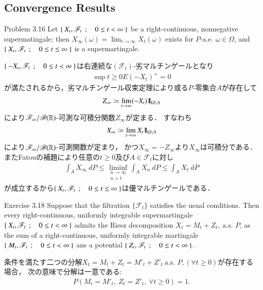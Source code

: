 \subsection{Convergence Results}
	\begin{itembox}[l]{Problem 3.16}
		Let $\left\{\ X_t,\mathscr{F}_t\ \, ; \quad 0 \leq t < \infty\ \right\}$ be a right-continuous, nonnegative
		supermatingale; then $X_\infty(\omega) = \lim_{t \to \infty} X_t(\omega)$ exists for
		$P$-a.e. $\omega \in \Omega$, and $\left\{\ X_t,\mathscr{F}_t\ \, ; \quad 0 \leq t \leq \infty\ \right\}$ is a supermartingale.
	\end{itembox}
	
	\begin{prf}
		$\left\{\ -X_t,\mathscr{F}_t\ \, ; \quad 0 \leq t < \infty\ \right\}$は右連続な$(\mathscr{F}_t)$-劣マルチンゲールとなり
		\begin{align}
			\sup{t \geq 0}{E(-X_t)^+} = 0
		\end{align}
		が満たされるから，劣マルチンゲール収束定理により或る$P$-零集合$A$が存在して
		\begin{align}
			Z_\infty \coloneqq \lim_{t \to \infty} (-X_t)\mbox{1}\hspace{-0.25em}\mbox{l}_{\Omega \backslash A}
		\end{align}
		により$\mathscr{F}_\infty/\mathscr{B}(\mathbb{R})$-可測な可積分関数$Z_\infty$が定まる．
		すなわち
		\begin{align}
			X_\infty \coloneqq \lim_{t \to \infty} X_t\mbox{1}\hspace{-0.25em}\mbox{l}_{\Omega \backslash A}
		\end{align}
		により$\mathscr{F}_\infty/\mathscr{B}(\mathbb{R})$-可測関数が定まり，
		かつ$X_\infty = -Z_\infty$より$X_\infty$は可積分である．
		またFatouの補題により任意の$t \geq 0$及び$A \in \mathscr{F}_t$に対し
		\begin{align}
			\int_A X_\infty\ dP \leq \liminf_{\substack{n \to \infty \\ n > t}} \int_A X_n\ dP \leq \int_A X_t\ dP
		\end{align}
		が成立するから$\left\{\ X_t,\mathscr{F}_t\ \, ; \quad 0 \leq t \leq \infty\ \right\}$は優マルチンゲールである．
		\QED
	\end{prf}
	
	\begin{itembox}[l]{Exercise 3.18}
		Suppose that the filtration $\{\mathscr{F}_t\}$ satisfies the usual conditions.
		Then every right-continuous, uniformly integrable supermartingale $\left\{\ X_t,\mathscr{F}_t\ \, ; \quad 0 \leq t < \infty\ \right\}$
		admits the Riesz decomposition $X_t = M_t + Z_t,\ \mbox{a.s. $P$}$, as the sum
		of a right-continuous, uniformly integrable martingale $\left\{\ M_t,\mathscr{F}_t\ \, ; \quad 0 \leq t < \infty\ \right\}$
		ans a potential $\left\{\ Z_t,\mathscr{F}_t\ \, ; \quad 0 \leq t < \infty\ \right\}$.
 	\end{itembox}
 	条件を満たす二つの分解$X_t = M_t + Z_t = M'_t + Z'_t\ \mbox{a.s. $P$}, (\forall t \geq 0)$が存在する場合，
 	次の意味で分解は一意である:
 	\begin{align}
 		P \left( M_t = M'_t,\ Z_t = Z'_t,\ \forall t \geq 0 \right) = 1.
 		\label{eq:chapter_1_Exercise_3_18_4}
 	\end{align}
 	
